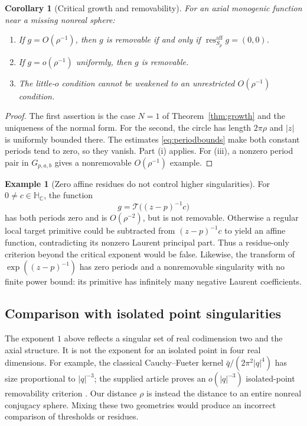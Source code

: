 \documentclass[11pt,a4paper]{article}
\numberwithin{equation}{section}
\newtheorem{corollary}[theorem]{Corollary}
\theoremstyle{definition}
\newtheorem{example}[theorem]{Example}
\theoremstyle{remark}
\newcommand{\C}{\mathbb C}
\newcommand{\HC}{\mathbb H_{\C}}
\newcommand{\T}{\mathcal T}
\newcommand{\resaff}{\operatorname{res}^{\mathrm{aff}}}
\begin{document}
\begin{corollary}[Critical growth and removability]
\label{cor:removable}
For an axial monogenic function near a missing nonreal sphere:
\begin{enumerate}[label=\textup{(\roman*)}]
\item If $g=O(\rho^{-1})$, then $g$ is removable if and only if
$\resaff_{S_p}g=(0,0)$.
\item If $g=o(\rho^{-1})$ uniformly, then $g$ is removable.
\item The little-$o$ condition cannot be weakened to an unrestricted
$O(\rho^{-1})$ condition.
\end{enumerate}
\end{corollary}
\begin{proof}
The first assertion is the case $N=1$ of Theorem~\ref{thm:growth} and the
uniqueness of the normal form. For the second, the circle has length
$2\pi\rho$ and $|z|$ is uniformly bounded there. The estimates
\eqref{eq:periodbounds} make both constant periods tend to zero, so they
vanish. Part (i) applies. For (iii), a nonzero period pair in
$G_{p,a,b}$ gives a nonremovable $O(\rho^{-1})$ example.
\end{proof}

\begin{example}[Zero affine residues do not control higher singularities]
\label{ex:zeroperiodpole}
For $0\ne c\in\HC$, the function
\[
 g=\T\bigl((z-p)^{-1}c\bigr)
\]
has both periods zero and is $O(\rho^{-2})$, but is not removable.
Otherwise a regular local target primitive could be subtracted from
$(z-p)^{-1}c$ to yield an affine function, contradicting its nonzero
Laurent principal part. Thus a residue-only criterion beyond the critical
exponent would be false. Likewise, the transform of
$\exp((z-p)^{-1})$ has zero periods and a nonremovable singularity with
no finite power bound: its primitive has infinitely many negative Laurent
coefficients.
\end{example}

\subsection{Comparison with isolated point singularities}
The exponent $1$ above reflects a singular set of real codimension two and
the axial structure. It is not the exponent for an isolated point in four
real dimensions. For example, the classical Cauchy--Fueter kernel
$\bar q/(2\pi^2|q|^4)$ has size proportional to $|q|^{-3}$; the supplied
article proves an $o(|q|^{-3})$ isolated-point removability criterion
\cite{Source}. Our distance $\rho$ is instead the distance to an entire
nonreal conjugacy sphere. Mixing these two geometries would produce an
incorrect comparison of thresholds or residues.
\end{document}
